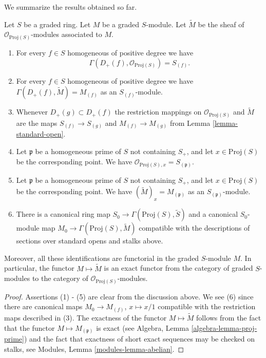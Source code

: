 \noindent
We summarize the results obtained so far.

\begin{lemma}
\label{lemma-proj-sheaves}
Let $S$ be a graded ring. Let $M$ be a graded $S$-module.
Let $\widetilde M$ be the sheaf of $\mathcal{O}_{\text{Proj}(S)}$-modules
associated to $M$.
\begin{enumerate}
\item For every $f \in S$ homogeneous of positive degree we have
$$
\Gamma(D_{+}(f), \mathcal{O}_{\text{Proj}(S)}) = S_{(f)}.
$$
\item For every $f\in S$ homogeneous of positive degree
we have $\Gamma(D_{+}(f), \widetilde M) = M_{(f)}$
as an $S_{(f)}$-module.
\item Whenever $D_{+}(g) \subset D_{+}(f)$ the restriction mappings
on $\mathcal{O}_{\text{Proj}(S)}$ and $\widetilde M$
are the maps
$S_{(f)} \to S_{(g)}$ and $M_{(f)} \to M_{(g)}$ from Lemma
\ref{lemma-standard-open}.
\item Let $\mathfrak p$ be a homogeneous prime of $S$ not containing
$S_{+}$, and let $x \in \text{Proj}(S)$
be the corresponding point. We have
$\mathcal{O}_{\text{Proj}(S), x} = S_{(\mathfrak p)}$.
\item Let $\mathfrak p$ be a homogeneous prime of $S$ not containing
$S_{+}$, and let $x \in \text{Proj}(S)$
be the corresponding point. We have $(\widetilde M)_x = M_{(\mathfrak p)}$
as an $S_{(\mathfrak p)}$-module.
\item
\label{item-map}
There is a canonical ring map
$
S_0 \longrightarrow \Gamma(\text{Proj}(S), \widetilde S)
$
and a canonical $S_0$-module map
$
M_0 \longrightarrow \Gamma(\text{Proj}(S), \widetilde M)
$
compatible with the descriptions of sections over standard opens
and stalks above.
\end{enumerate}
Moreover, all these identifications are functorial in the graded
$S$-module $M$. In particular, the functor $M \mapsto \widetilde M$
is an exact functor from the category of graded $S$-modules
to the category of $\mathcal{O}_{\text{Proj}(S)}$-modules.
\end{lemma}

\begin{proof}
Assertions (1) - (5) are clear from the discussion above.
We see (6) since there are canonical maps $M_0 \to M_{(f)}$,
$x \mapsto x/1$ compatible with the restriction maps
described in (3). The exactness of the functor $M \mapsto \widetilde M$
follows from the fact that the functor $M \mapsto M_{(\mathfrak p)}$
is exact (see Algebra, Lemma \ref{algebra-lemma-proj-prime})
and the fact that exactness of short exact sequences
may be checked on stalks, see
Modules, Lemma \ref{modules-lemma-abelian}.
\end{proof}

